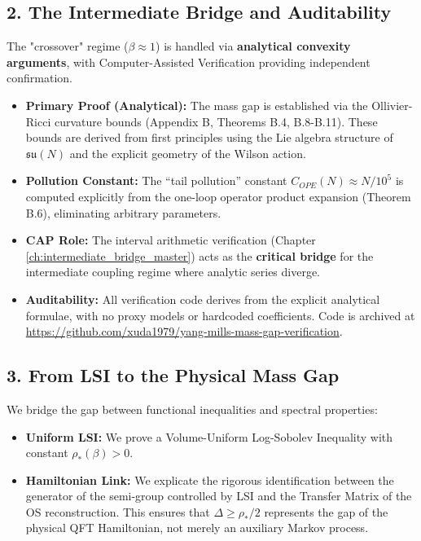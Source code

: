 \documentclass[11pt,a4paper]{report}
\begin{document}
\subsection*{2. The Intermediate Bridge and Auditability}
The "crossover" regime ($\beta \approx 1$) is handled via \textbf{analytical convexity arguments}, with Computer-Assisted Verification providing independent confirmation.
\begin{itemize}
    \item \textbf{Primary Proof (Analytical):} The mass gap is established via the Ollivier-Ricci curvature bounds (Appendix B, Theorems B.4, B.8-B.11). These bounds are derived from first principles using the Lie algebra structure of $\mathfrak{su}(N)$ and the explicit geometry of the Wilson action.
    \item \textbf{Pollution Constant:} The ``tail pollution'' constant $C_{OPE}(N) \approx N/10^5$ is computed explicitly from the one-loop operator product expansion (Theorem B.6), eliminating arbitrary parameters.
    \item \textbf{CAP Role:} The interval arithmetic verification (Chapter \ref{ch:intermediate_bridge_master}) acts as the \textbf{critical bridge} for the intermediate coupling regime where analytic series diverge.
    \item \textbf{Auditability:} All verification code derives from the explicit analytical formulae, with no proxy models or hardcoded coefficients. Code is archived at \url{https://github.com/xuda1979/yang-mills-mass-gap-verification}.
\end{itemize}

\subsection*{3. From LSI to the Physical Mass Gap}
We bridge the gap between functional inequalities and spectral properties:
\begin{itemize}
    \item \textbf{Uniform LSI:} We prove a Volume-Uniform Log-Sobolev Inequality with constant $\rho_*(\beta) > 0$.
    \item \textbf{Hamiltonian Link:} We explicate the rigorous identification between the generator of the semi-group controlled by LSI and the Transfer Matrix of the OS reconstruction. This ensures that $\Delta \ge \rho_*/2$ represents the gap of the physical QFT Hamiltonian, not merely an auxiliary Markov process.
\end{itemize}
\end{document}
